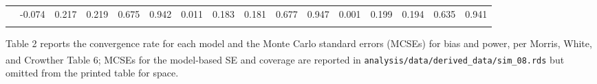 \documentclass[
  11pt,
]{article}
\begin{document}
\begin{table}
{\begin{tabular}[t]{rrrrrrrrrrrrrrrr}
\addlinespace
2.0 & -0.074 & 0.217 & 0.219 & 0.675 & 0.942 & 0.011 & 0.183 & 0.181 & 0.677 & 0.947 & 0.001 & 0.199 & 0.194 & 0.635 & 0.941\\
\cellcolor{gray!10}{3.0} & \cellcolor{gray!10}{-0.076} & \cellcolor{gray!10}{0.214} & \cellcolor{gray!10}{0.220} & \cellcolor{gray!10}{0.657} & \cellcolor{gray!10}{0.948} & \cellcolor{gray!10}{0.035} & \cellcolor{gray!10}{0.184} & \cellcolor{gray!10}{0.182} & \cellcolor{gray!10}{0.629} & \cellcolor{gray!10}{0.951} & \cellcolor{gray!10}{-0.006} & \cellcolor{gray!10}{0.201} & \cellcolor{gray!10}{0.195} & \cellcolor{gray!10}{0.641} & \cellcolor{gray!10}{0.944}\\
\bottomrule
\end{tabular}}
\end{table}

Table 2 reports the convergence rate for each model and the
Monte Carlo standard errors (MCSEs) for bias and power, per
Morris, White, and Crowther\textsuperscript{} Table 6; MCSEs
for the model-based SE and coverage are reported in
\texttt{analysis/data/derived\_data/sim\_08.rds} but omitted from the
printed table for space.

\FloatBarrier
\end{document}
